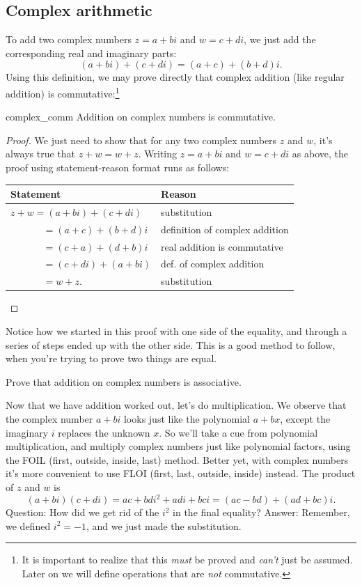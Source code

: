 \subsection{Complex arithmetic}

To add two complex numbers $z=a+bi$ and $w=c+di$, we just add the
corresponding real and imaginary parts: 
\[(a+bi)+(c+di)=(a+c)+(b+d)i.\]
Using this definition, we may prove directly that complex addition (like regular addition) is commutative:\footnote{It is important to realize that this \emph{must} be proved and \emph{can't} just be assumed.  Later on we will define operations that are \emph{not} commutative.}

\begin{prop}{complex_comm}
Addition on complex numbers is commutative.
\end{prop}
\begin{proof}
We just need to show that for any two complex numbers $z$ and $w$, it's always true that $z + w = w + z$.  Writing $z = a + bi$ and $w = c + di$ as above, the proof using statement-reason format runs as follows:

\begin{tabular}{l| l}
Statement& Reason\\
\hline
$z + w = (a + bi) + (c + di)$ &substitution\\
~~~~~~ $= (a + c) + (b + d)i$ & definition of complex addition\\
~~~~~~ $= (c + a) + (d + b)i$ & real addition is commutative\\
~~~~~~ $= (c + di) + (a + bi)$ & def. of complex addition\\
~~~~~~ $= w + z$. & substitution\\
\end{tabular}

\end{proof}

Notice how we started in this proof with one side of the equality, and through a series of steps ended up with the other side. This is a good method to follow, when you're trying to prove two things are equal.

\begin{exercise}{}
Prove that addition on complex numbers is associative.
\end{exercise}

Now that we have addition worked out, let's do multiplication. We observe that the complex number $a + bi$ looks just  like the polynomial $a + bx$, except the imaginary $i$ replaces the unknown $x$. So we'll take a cue from polynomial multiplication, and  multiply complex numbers just like
polynomial factors, using the FOIL (first, outside, inside, last) method. Better yet, with complex numbers it's more convenient to use FLOI (first, last, outside, inside) instead.  The product of $z$ and
$w$ is \[
(a+bi)(c+di)=ac+bdi^{2}+adi+bci=(ac-bd)+(ad+bc)i.\]
Question: How did we get rid of the $i^2$ in the final equality?  Answer: Remember, we defined $i^2 = -1$, and we just made the substitution.

